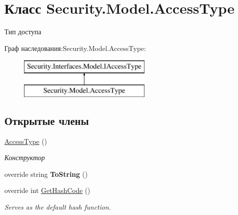 \hypertarget{class_security_1_1_model_1_1_access_type}{}\section{Класс Security.\+Model.\+Access\+Type}
\label{class_security_1_1_model_1_1_access_type}


Тип доступа  


Граф наследования\+:Security.\+Model.\+Access\+Type\+:\begin{figure}[H]
\begin{center}
\leavevmode
\includegraphics[height=2.000000cm]{da/d39/class_security_1_1_model_1_1_access_type}
\end{center}
\end{figure}
\subsection*{Открытые члены}
\begin{DoxyCompactItemize}
\item 
\hyperlink{class_security_1_1_model_1_1_access_type_a02acee54b3fff440e511240f4e81e67a}{Access\+Type} ()
\begin{DoxyCompactList}\small\item\em Конструктор \end{DoxyCompactList}\item 
\mbox{\label{class_security_1_1_model_1_1_access_type_a651a5190b2588eba67e56da8c5995446}} 
override string {\bfseries To\+String} ()
\item 
override int \hyperlink{class_security_1_1_model_1_1_access_type_a6983c2a9fe39b6ae84316e01f134014a}{Get\+Hash\+Code} ()
\begin{DoxyCompactList}\small\item\em Serves as the default hash function. \end{DoxyCompactList}\end{DoxyCompactItemize}
